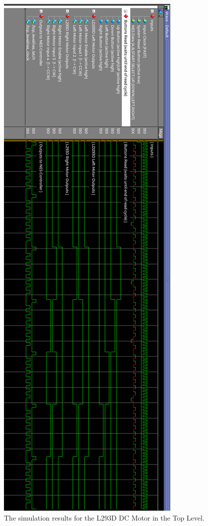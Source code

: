 \documentclass[a4paper]{article}
\begin{document}
\begin{figure}[h]
  \centering
    \includegraphics[height=0.98\textheight]{sims/top_level_motor_sim.png}
	\caption{The simulation results for the L293D DC Motor in the Top Level.}
    \label{fig:top-level-sim}
\end{figure}
\end{document}
